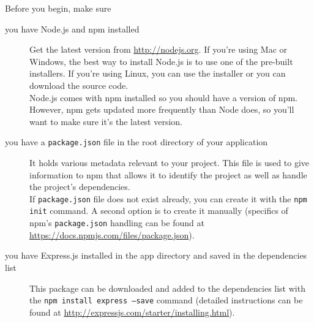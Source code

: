 	Before you begin, make sure
	\begin{description}
		\item[you have Node.js and npm installed] Get the latest version from \url{http://nodejs.org}. If you're using Mac or Windows, the best way to install Node.js is to use one of the pre-built installers. If you're using Linux, you can use the installer or you can download the source code.\\
		Node.js comes with npm installed so you should have a version of npm. However, npm gets updated more frequently than Node does, so you'll want to make sure it's the latest version.
		\item[you have a \texttt{package.json} file in the root directory of your application] It holds various metadata relevant to your project. This file is used to give information to npm that allows it to identify the project as well as handle the project's dependencies.\\
		If \texttt{package.json} file does not exist already, you can create it with the \texttt{npm init} command. A second option is to create it manually (specifics of npm's \texttt{package.json} handling can be found at \url{https://docs.npmjs.com/files/package.json}).
		\item[you have Express.js installed in the app directory and saved in the dependencies list] This package can be downloaded and added to the dependencies list with the \texttt{npm install express --save} command (detailed instructions can be found at \url{http://expressjs.com/starter/installing.html}).
	\end{description}